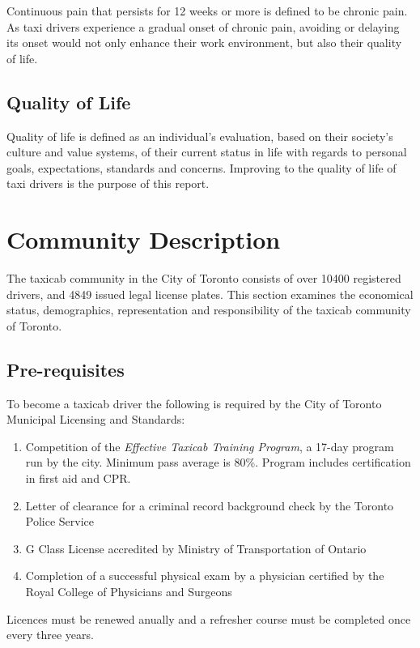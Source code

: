 \documentclass[11pt]{article}
\begin{document}
Continuous pain that persists for 12 weeks or more is defined to be
chronic pain\cite{chronic}. As taxi drivers experience a gradual onset of chronic
pain, avoiding or delaying its onset would not only enhance their work
environment, but also their quality of life.

\subsection{Quality of Life}
\label{sec:lifequal}

Quality of life is defined as an individual's evaluation, based on
their society's culture and value systems, of their current status in
life with regards to personal goals, expectations, standards and
concerns\cite{WHO}. Improving to the quality of life of taxi drivers is the
purpose of this report.

\section{Community Description}
\label{sec:community}
The taxicab community in the City of Toronto consists of over 10400 registered drivers, 
and 4849 issued legal license plates. This section examines the economical status, 
demographics, representation and responsibility of the taxicab community of Toronto. 

\subsection{Pre-requisites}
To become a taxicab driver the following is required by the City of Toronto Municipal Licensing and Standards:
\begin{enumerate}
\item Competition of the \emph{Effective Taxicab Training Program}, a 17-day program run by the city. 
Minimum pass average is 80\%. Program includes certification in first aid and CPR.
\item Letter of clearance for a criminal record background check by the Toronto Police Service
\item G Class License accredited by Ministry of Transportation of Ontario 
\item Completion of a successful physical exam by a physician certified by the Royal College of Physicians and Surgeons 
\end{enumerate}

Licences must be renewed anually %
and a refresher course must be completed once every three years\cite{MLSChp545}.
\end{document}
